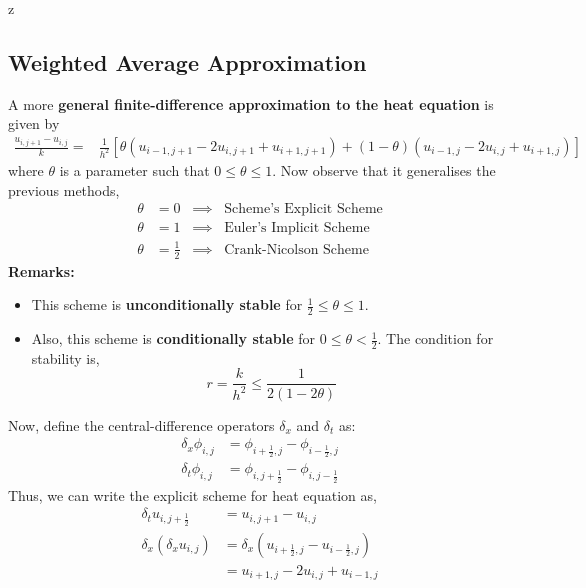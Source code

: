 z\documentclass[a4paper,12pt,twoside]{book}
\newcommand{\nll}[0]{\newline\newline}
\begin{document}
\subsection{Weighted Average Approximation}
A more \textbf{general finite-difference approximation to the heat equation} is given by
\begin{equation}
    \begin{split}
        \frac{u_{i,j+1} - u_{i,j}}{k} = & \frac{1}{h^2} \left[ \theta(u_{i-1,j+1} - 2u_{i,j+1} + u_{i+1,j+1}) + (1-\theta)(u_{i-1,j} - 2u_{i,j} + u_{i+1,j}) \right]
    \end{split}
\end{equation}
where $\theta$ is a parameter such that $0 \le \theta \le 1$.
\nll
Now observe that it generalises the previous methods,
\begin{equation}
    \begin{split}
        \theta &= 0 \;\;\implies\;\;\text{Scheme's Explicit Scheme}\\
        \theta &= 1 \;\;\implies\;\;\text{Euler's Implicit Scheme}\\
        \theta &= \frac{1}{2} \;\;\implies\;\;\text{Crank-Nicolson Scheme}
    \end{split}
\end{equation}
\textbf{Remarks:}
\begin{itemize}
    \item {This scheme is \textbf{unconditionally stable} for $\frac{1}{2}\le \theta \le 1$.}
    \item{Also, this scheme is \textbf{conditionally stable} for $0\le \theta < \frac{1}{2}$. The condition for stability is,
    \[r = \frac{k}{h^2} \le \frac{1}{2(1-2\theta)}\]
    }
\end{itemize}
Now, define the central-difference operators $\delta_x$ and $\delta_t$ as:
\begin{equation}
    \begin{split}
        \delta_x \phi_{i,j} &= \phi_{i+\frac{1}{2},j} - \phi_{i-\frac{1}{2},j}\\
        \delta_t \phi_{i,j} &= \phi_{i,j+\frac{1}{2}} - \phi_{i,j-\frac{1}{2}}
    \end{split}
\end{equation}
Thus, we can write the explicit scheme for heat equation as,
\begin{equation}
    \begin{split}
        \delta_tu_{i,j+\frac{1}{2}} &= u_{i,j+1} - u_{i,j}\\
        \delta_x (\delta_x u_{i,j}) &= \delta_x(u_{i+\frac{1}{2},j} - u_{i-\frac{1}{2},j} )\\
        &= u_{i+1,j} - 2u_{i,j} + u_{i-1,j}
    \end{split}
\end{equation}
\end{document}
